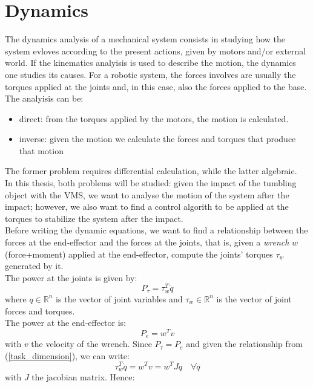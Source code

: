 \documentclass[a4paper,12pt,oneside]{report}
\begin{document}
\chapter{Dynamics}\label{dynamics}
The dynamics analysis of a mechanical system consists in studying how the system evloves according to the present actions, given by motors and/or external world. If the kinematics analyisis is used to describe the motion, the dynamics one studies its causes. For a robotic system, the forces involves are usually the torques applied at the joints and, in this case, also the forces applied to the base.\\
The analyisis can be:
\begin{itemize}
  \item direct: from the torques applied by the motors, the motion is calculated.
  \item inverse: given the motion we calculate the forces and torques that produce that motion
\end{itemize}
The former problem requires differential calculation, while the latter algebraic.\\
In this thesis, both problems will be studied: given the impact of the tumbling object with the VMS, we want to analyse the motion of the system after the impact; however, we also want to find a control algorith to be applied at the torques to stabilize the system after the impact.\\
Before writing the dynamic equations, we want to find a relationship between the forces at the end-effector and the forces at the joints, that is, given a \textit{wrench} $w$ (force+moment) applied at the end-effector, compute the joints' torques $\tau_w$ generated by it.\\
The power at the joints is given by:
\begin{equation}
  P_{\tau}=\tau_w^T\dot{q}
\end{equation}
where $q \in \mathbb{R}^n$ is the vector of joint variables and  $\tau_w \in \mathbb{R}^n$ is the vector of joint forces and torques.\\
The power at the end-effector is:
\begin{equation}
  P_e=w^Tv
\end{equation}
with $v$ the velocity of the wrench. Since $P_\tau=P_e$ and given the relationship from (\ref{task_dimension}), we can write:
\begin{equation}
  \tau_w^T\dot{q}=w^Tv=w^TJ\dot{q} \quad \forall\dot{q}
\end{equation}
with $J$ the jacobian matrix. Hence:
\end{document}
